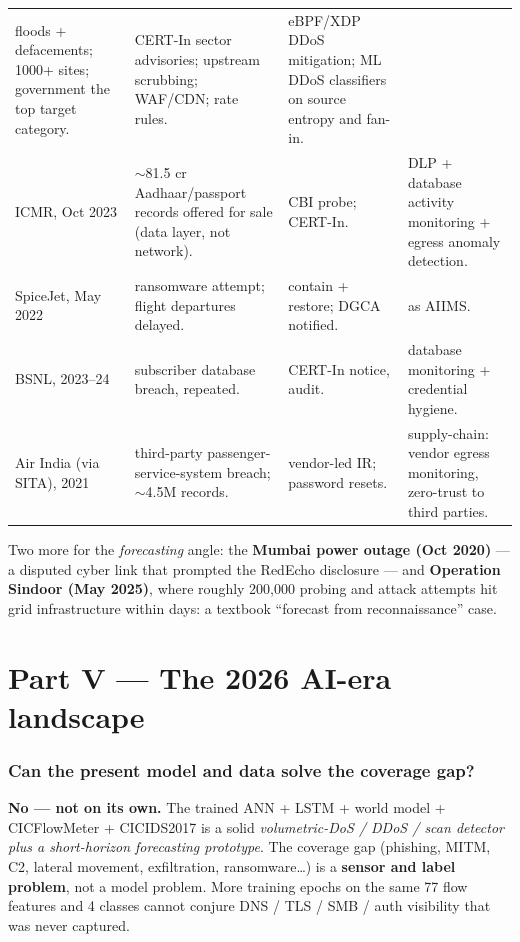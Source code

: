 \documentclass[11pt,a4paper]{article}
\begin{document}
\begin{longtable}{@{}p{2.6cm}p{5.1cm}p{3.2cm}p{3.3cm}@{}}
floods + defacements; 1000+ sites; government the top target category. & CERT-In
sector advisories; upstream scrubbing; WAF/CDN; rate rules. & eBPF/XDP DDoS
mitigation; ML DDoS classifiers on source entropy and fan-in. \\
ICMR, Oct 2023 & $\sim$81.5 cr Aadhaar/passport records offered for sale
(data layer, not network). & CBI probe; CERT-In. & DLP + database activity
monitoring + egress anomaly detection. \\
SpiceJet, May 2022 & ransomware attempt; flight departures delayed. & contain +
restore; DGCA notified. & as AIIMS. \\
BSNL, 2023--24 & subscriber database breach, repeated. & CERT-In notice, audit. &
database monitoring + credential hygiene. \\
Air India (via SITA), 2021 & third-party passenger-service-system breach;
$\sim$4.5M records. & vendor-led IR; password resets. & supply-chain: vendor
egress monitoring, zero-trust to third parties. \\
\end{longtable}

Two more for the \emph{forecasting} angle: the \textbf{Mumbai power outage
(Oct 2020)} --- a disputed cyber link that prompted the RedEcho disclosure --- and
\textbf{Operation Sindoor (May 2025)}, where roughly 200,000 probing and attack
attempts hit grid infrastructure within days: a textbook ``forecast from
reconnaissance'' case.

\clearpage
\part*{Part V --- The 2026 AI-era landscape}

\section{Can the present model and data solve the coverage gap?}

\textbf{No --- not on its own.} The trained ANN + LSTM + world model +
CICFlowMeter + CICIDS2017 is a solid \emph{volumetric-DoS / DDoS / scan detector
plus a short-horizon forecasting prototype}. The coverage gap (phishing, MITM,
C2, lateral movement, exfiltration, ransomware\dots) is a \textbf{sensor and
label problem}, not a model problem. More training epochs on the same 77 flow
features and 4 classes cannot conjure DNS / TLS / SMB / auth visibility that was
never captured.
\end{document}

